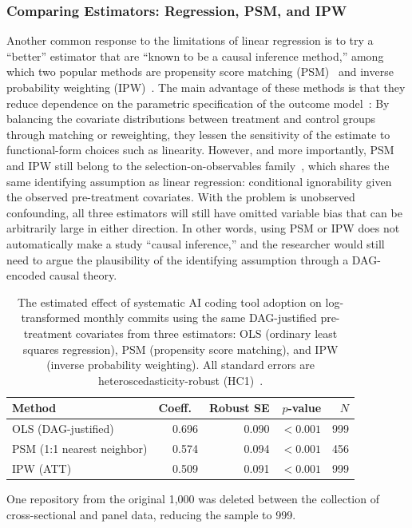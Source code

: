 \subsubsection{Comparing Estimators: Regression, PSM, and IPW}
\label{sec:estimator-convergence}

Another common response to the limitations of linear regression is to try a ``better'' estimator that are ``known to be a causal inference method,'' among which two popular methods are propensity score matching (PSM)~\cite{rosenbaum1983central} and inverse probability weighting (IPW)~\cite{horvitz1952generalization}.
The main advantage of these methods is that they reduce dependence on the parametric specification of the outcome model~\cite{ho2007matching}: By balancing the covariate distributions between treatment and control groups through matching or reweighting, they lessen the sensitivity of the estimate to functional-form choices such as linearity.
However, and more importantly, PSM and IPW still belong to the selection-on-observables family~\cite{imbens2009recent}, which shares the same identifying assumption as linear regression: conditional ignorability given the observed pre-treatment covariates.
With the problem is unobserved confounding, all three estimators will still have omitted variable bias that can be arbitrarily large in either direction.
In other words, using PSM or IPW does not automatically make a study ``causal inference,'' and the researcher would still need to argue the plausibility of the identifying assumption through a DAG-encoded causal theory.

\begin{table}[t]
  \centering
  \caption{The estimated effect of systematic AI coding tool adoption on log-transformed monthly commits using the same DAG-justified pre-treatment covariates from three estimators: OLS (ordinary least squares regression), PSM (propensity score matching), and IPW (inverse probability weighting).
  \label{tab:three-estimators}
  All standard errors are heteroscedasticity-robust (HC1)~\cite{mackinnon1985heteroskedasticity}.}
  \begin{threeparttable}
  \small
  \begin{tabular}{lrrrr}
  \toprule
  Method & Coeff.\ & Robust SE & $p$-value & $N$ \\
  \midrule
  OLS (DAG-justified) & 0.696 & 0.090 & ${<}0.001$ & 999\tnote{a} \\
  PSM (1:1 nearest neighbor) & 0.574 & 0.094 & ${<}0.001$ & 456 \\
  IPW (ATT) & 0.509 & 0.091 & ${<}0.001$ & 999\tnote{a} \\
  \bottomrule
  \end{tabular}
  \begin{tablenotes}
  \footnotesize
  \item[a] One repository from the original 1,000 was deleted between the collection of cross-sectional and panel data, reducing the sample to 999.
  \end{tablenotes}
  \end{threeparttable}
  \end{table}

